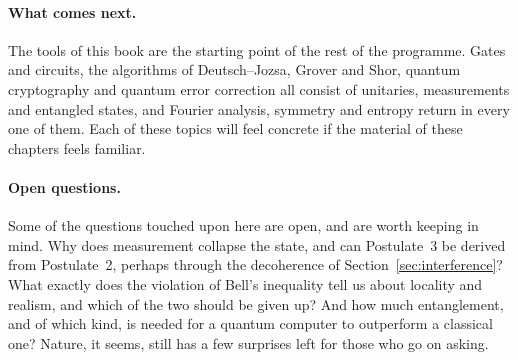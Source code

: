 \paragraph{What comes next.}
The tools of this book are the starting point of the rest of the programme. Gates and circuits, the algorithms of Deutsch--Jozsa, Grover and Shor, quantum cryptography and quantum error correction all consist of unitaries, measurements and entangled states, and Fourier analysis, symmetry and entropy return in every one of them. Each of these topics will feel concrete if the material of these chapters feels familiar.

\paragraph{Open questions.}
Some of the questions touched upon here are open, and are worth keeping in mind. Why does measurement collapse the state, and can Postulate~3 be derived from Postulate~2, perhaps through the decoherence of Section~\ref{sec:interference}? What exactly does the violation of Bell's inequality tell us about locality and realism, and which of the two should be given up? And how much entanglement, and of which kind, is needed for a quantum computer to outperform a classical one? Nature, it seems, still has a few surprises left for those who go on asking.
